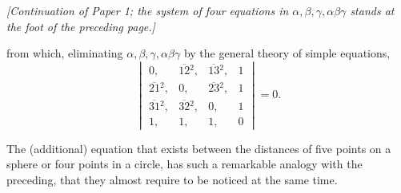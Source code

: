 \documentclass[11pt]{article}
\begin{document}
\setlength{\parindent}{1.5em}


\noindent\textit{[Continuation of Paper 1; the system of four equations in $\alpha,\beta,\gamma,\alpha\beta\gamma$ stands at the foot of the preceding page.]}

\medskip

from which, eliminating $\alpha, \beta, \gamma, \alpha\beta\gamma$ by the general theory of simple equations,
\[
\begin{vmatrix}
0, & \overline{12}{}^2, & \overline{13}{}^2, & 1 \\
\overline{21}{}^2, & 0, & \overline{23}{}^2, & 1 \\
\overline{31}{}^2, & \overline{32}{}^2, & 0, & 1 \\
1, & 1, & 1, & 0
\end{vmatrix} = 0.
\]

\medskip

The (additional) equation that exists between the distances of five points on a sphere or four points in a circle, has such a remarkable analogy with the preceding, that they almost require to be noticed at the same time.
\end{document}
